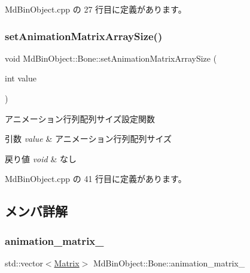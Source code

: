  Md\+Bin\+Object.\+cpp の 27 行目に定義があります。

\mbox{\label{class_md_bin_object_1_1_bone_ad3d6cc591c4a08d349095374c5e72d9c}} 
\subsubsection{\texorpdfstring{set\+Animation\+Matrix\+Array\+Size()}{setAnimationMatrixArraySize()}}
{\footnotesize\ttfamily void Md\+Bin\+Object\+::\+Bone\+::set\+Animation\+Matrix\+Array\+Size (\begin{DoxyParamCaption}\item[{int}]{value }\end{DoxyParamCaption})}



アニメーション行列配列サイズ設定関数 


\begin{DoxyParams}{引数}
{\em value} & アニメーション行列配列サイズ \\
\hline
\end{DoxyParams}

\begin{DoxyRetVals}{戻り値}
{\em void} & なし \\
\hline
\end{DoxyRetVals}


 Md\+Bin\+Object.\+cpp の 41 行目に定義があります。



\subsection{メンバ詳解}
\mbox{\label{class_md_bin_object_1_1_bone_a0b2968694781bca6852ce0675f69504a}} 
\subsubsection{\texorpdfstring{animation\+\_\+matrix\+\_\+}{animation\_matrix\_}}
{\footnotesize\ttfamily std\+::vector$<$\mbox{\hyperlink{class_matrix}{Matrix}}$>$ Md\+Bin\+Object\+::\+Bone\+::animation\+\_\+matrix\+\_\+\hspace{0.3cm}{\ttfamily [private]}}



